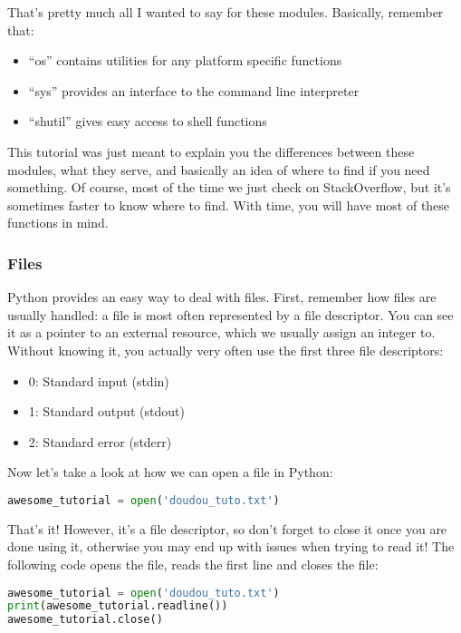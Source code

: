 \vspace{5mm}

That's pretty much all I wanted to say for these modules. Basically, remember that:

\begin{itemize}
\item ``os'' contains utilities for any platform specific functions
\item ``sys'' provides an interface to the command line interpreter
\item ``shutil'' gives easy access to shell functions
\end{itemize}

This tutorial was just meant to explain you the differences between these modules,
what they serve, and basically an idea of where to find if you need something.
Of course, most of the time we just check on StackOverflow, but it's sometimes
faster to know where to find. With time, you will have most of these functions in mind.

\subsubsection{Files}
Python provides an easy way to deal with files. First, remember how files are usually
handled: a file is most often represented by a file descriptor. You can see it as a
pointer to an external resource, which we usually assign an integer to. Without knowing
it, you actually very often use the first three file descriptors:

\begin{itemize}
\item 0: Standard input (stdin)
\item 1: Standard output (stdout)
\item 2: Standard error (stderr)
\end{itemize}

Now let's take a look at how we can open a file in Python:

\begin{lstlisting}[language=python]
awesome_tutorial = open('doudou_tuto.txt')
\end{lstlisting}

That's it! However, it's a file descriptor, so don't forget to close it once you
are done using it, otherwise you may end up with issues when trying to read it!
The following code opens the file, reads the first line and closes the file:

\begin{lstlisting}[language=python]
awesome_tutorial = open('doudou_tuto.txt')
print(awesome_tutorial.readline())
awesome_tutorial.close()
\end{lstlisting}

